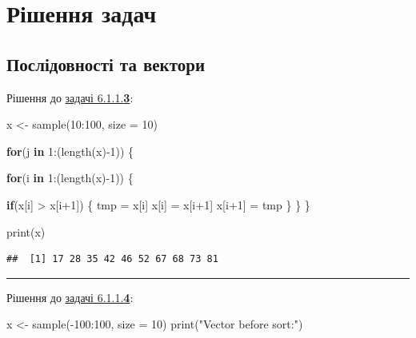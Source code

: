 \documentclass[
]{book}
\newenvironment{Shaded}{\begin{snugshade}}{\end{snugshade}}
\newcommand{\AttributeTok}[1]{\textcolor[rgb]{0.77,0.63,0.00}{#1}}
\newcommand{\ControlFlowTok}[1]{\textcolor[rgb]{0.13,0.29,0.53}{\textbf{#1}}}
\newcommand{\DecValTok}[1]{\textcolor[rgb]{0.00,0.00,0.81}{#1}}
\newcommand{\FunctionTok}[1]{\textcolor[rgb]{0.00,0.00,0.00}{#1}}
\newcommand{\NormalTok}[1]{#1}
\newcommand{\OtherTok}[1]{\textcolor[rgb]{0.56,0.35,0.01}{#1}}
\newcommand{\SpecialCharTok}[1]{\textcolor[rgb]{0.00,0.00,0.00}{#1}}
\newcommand{\StringTok}[1]{\textcolor[rgb]{0.31,0.60,0.02}{#1}}
\begin{document}
\hypertarget{chapter62}{%
\section{Рішення задач}\label{chapter62}}

\hypertarget{chapter621}{%
\subsection{Послідовності та вектори}\label{chapter621}}

Рішення до \protect\hyperlink{task6113}{задачі 6.1.1.\textbf{3}}:

\begin{Shaded}
\begin{Highlighting}[]
\NormalTok{x }\OtherTok{\textless{}{-}} \FunctionTok{sample}\NormalTok{(}\DecValTok{10}\SpecialCharTok{:}\DecValTok{100}\NormalTok{, }\AttributeTok{size =} \DecValTok{10}\NormalTok{)}
  
\ControlFlowTok{for}\NormalTok{(j }\ControlFlowTok{in} \DecValTok{1}\SpecialCharTok{:}\NormalTok{(}\FunctionTok{length}\NormalTok{(x)}\SpecialCharTok{{-}}\DecValTok{1}\NormalTok{)) \{}
  
  \ControlFlowTok{for}\NormalTok{(i }\ControlFlowTok{in} \DecValTok{1}\SpecialCharTok{:}\NormalTok{(}\FunctionTok{length}\NormalTok{(x)}\SpecialCharTok{{-}}\DecValTok{1}\NormalTok{)) \{}
    
    \ControlFlowTok{if}\NormalTok{(x[i] }\SpecialCharTok{\textgreater{}}\NormalTok{ x[i}\SpecialCharTok{+}\DecValTok{1}\NormalTok{]) \{}
\NormalTok{      tmp }\OtherTok{=}\NormalTok{ x[i]}
\NormalTok{      x[i] }\OtherTok{=}\NormalTok{ x[i}\SpecialCharTok{+}\DecValTok{1}\NormalTok{]}
\NormalTok{      x[i}\SpecialCharTok{+}\DecValTok{1}\NormalTok{] }\OtherTok{=}\NormalTok{ tmp}
\NormalTok{    \}}
\NormalTok{  \}}
\NormalTok{\}}

\FunctionTok{print}\NormalTok{(x)}
\end{Highlighting}
\end{Shaded}

\begin{verbatim}
##  [1] 17 28 35 42 46 52 67 68 73 81
\end{verbatim}

\begin{center}\rule{0.5\linewidth}{0.5pt}\end{center}

Рішення до \protect\hyperlink{task6114}{задачі 6.1.1.\textbf{4}}:

\begin{Shaded}
\begin{Highlighting}[]
\NormalTok{x }\OtherTok{\textless{}{-}} \FunctionTok{sample}\NormalTok{(}\SpecialCharTok{{-}}\DecValTok{100}\SpecialCharTok{:}\DecValTok{100}\NormalTok{, }\AttributeTok{size =} \DecValTok{10}\NormalTok{)}
\FunctionTok{print}\NormalTok{(}\StringTok{"Vector before sort:"}\NormalTok{)}
\end{Highlighting}
\end{Shaded}
\end{document}
